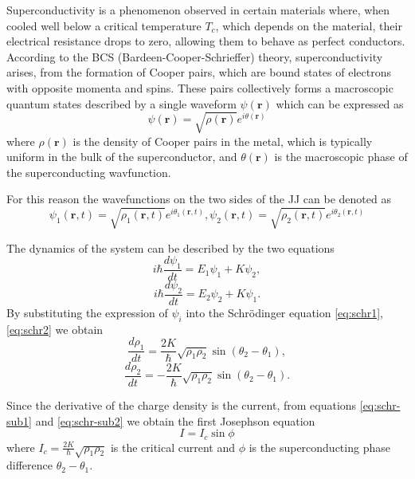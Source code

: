 Superconductivity is a phenomenon observed in certain materials where, when cooled well below a critical temperature $T_c$, which depends on the material, their electrical resistance drops to zero, allowing them to behave as perfect conductors.
According to the BCS (Bardeen-Cooper-Schrieffer) theory, superconductivity arises, from the formation of Cooper pairs, which are bound states of electrons with opposite momenta and spins.
These pairs collectively forms a macroscopic quantum states described by a single waveform $\psi(\mathbf{r})$ which can be expressed as 
\begin{equation}\label{eq:BCSequation}
    \psi(\mathbf{r}) = \sqrt{\rho(\mathbf{r})}e^{i\theta(\mathbf{r})}
\end{equation}
where $\rho(\mathbf{r})$ is the density of Cooper pairs in the metal, which is typically uniform in the bulk of the superconductor, and $\theta(\mathbf{r})$ is the macroscopic phase of the superconducting wavfunction.

For this reason the wavefunctions on the two sides of the JJ can be denoted as
\begin{equation}\label{eq:JosephsonWavefunctions}
    \psi_1(\mathbf{r}, t) = \sqrt{\rho_1(\mathbf{r}, t)} e^{i\theta_1(\mathbf{r},t)}, \psi_2(\mathbf{r}, t) = \sqrt{\rho_2(\mathbf{r}, t)} e^{i\theta_2(\mathbf{r},t)}
\end{equation}

The dynamics of the system can be described by the two equations\begin{equation}\label{eq:schr1}
    i\hbar \frac{d\psi_1}{dt} = E_1 \psi_1 + K \psi_2,
\end{equation}
\begin{equation}\label{eq:schr2}
    i\hbar \frac{d\psi_2}{dt} = E_2 \psi_2 + K \psi_1.
\end{equation}
By substituting the expression of $\psi_i$ into the Schr\"odinger equation \ref{eq:schr1}, \ref{eq:schr2} we obtain
\begin{equation}\label{eq:schr-sub1}
    \frac{d\rho_1}{dt} = \frac{2K}{\hbar} \sqrt{\rho_1 \rho_2} \sin(\theta_2 - \theta_1),
\end{equation}
\begin{equation}\label{eq:schr-sub2}
    \frac{d\rho_2}{dt} = -\frac{2K}{\hbar} \sqrt{\rho_1 \rho_2} \sin(\theta_2 - \theta_1).
\end{equation}

Since the derivative of the charge density is the current, from equations \ref{eq:schr-sub1} and \ref{eq:schr-sub2} we obtain the first Josephson equation
\begin{equation}\label{eq:Josephson1}
    I=I_c\sin{\phi}
\end{equation} 
where $I_c = \frac{2K}{\hbar}\sqrt{\rho_1\rho_2}$ is the critical current and $\phi$ is the superconducting phase difference $\theta_2 - \theta_1$.


